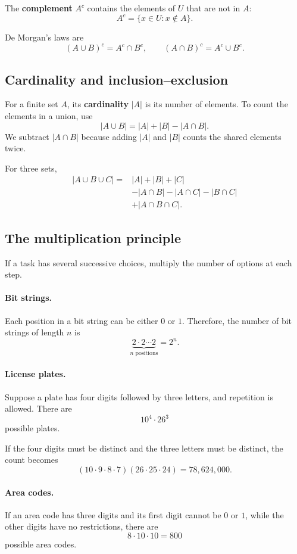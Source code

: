 \documentclass[11pt]{article}
\begin{document}
The \textbf{complement} $A^c$ contains the elements of $U$ that are
not in $A$:
\[
A^c=\{x\in U:x\notin A\}.
\]

De Morgan's laws are
\[
(A\cup B)^c=A^c\cap B^c,
\qquad
(A\cap B)^c=A^c\cup B^c.
\]

\subsection{Cardinality and inclusion--exclusion}

For a finite set $A$, its \textbf{cardinality} $|A|$ is its number
of elements. To count the elements in a union, use
\[
|A\cup B|=|A|+|B|-|A\cap B|.
\]
We subtract $|A\cap B|$ because adding $|A|$ and $|B|$ counts
the shared elements twice.

For three sets,
\[
\begin{aligned}
|A\cup B\cup C|
={}&|A|+|B|+|C|\\
&-|A\cap B|-|A\cap C|-|B\cap C|\\
&+|A\cap B\cap C|.
\end{aligned}
\]

\subsection{The multiplication principle}

If a task has several successive choices, multiply the number of
options at each step.

\paragraph{Bit strings.}
Each position in a bit string can be either $0$ or $1$. Therefore,
the number of bit strings of length $n$ is
\[
\underbrace{2\cdot2\cdots2}_{n\text{ positions}}=2^n.
\]

\paragraph{License plates.}
Suppose a plate has four digits followed by three letters, and
repetition is allowed. There are
\[
10^4\cdot26^3
\]
possible plates.

If the four digits must be distinct and the three letters must be
distinct, the count becomes
\[
(10\cdot9\cdot8\cdot7)(26\cdot25\cdot24)
=78{,}624{,}000.
\]

\paragraph{Area codes.}
If an area code has three digits and its first digit cannot be $0$
or $1$, while the other digits have no restrictions, there are
\[
8\cdot10\cdot10=800
\]
possible area codes.
\end{document}
